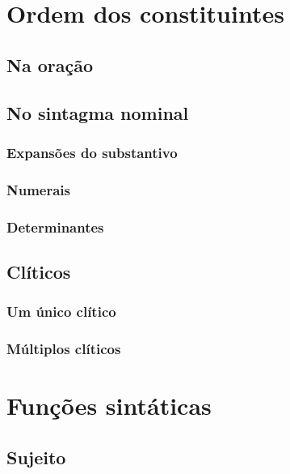 
\section{Ordem dos constituintes}
\lipsum[1]

\subsection{Na oração}
\lipsum[2]

\subsection{No sintagma nominal}
\lipsum[3]

\subsubsection{Expansões do substantivo}
\lipsum[4]

\subsubsection{Numerais}
\lipsum[5]

\subsubsection{Determinantes}\label{sec:determinação}
\lipsum[6]

\subsection{Clíticos}
\lipsum[7]

\subsubsection{Um único clítico}
\lipsum[8]

\subsubsection{Múltiplos clíticos}
\lipsum[9]

\section{Funções sintáticas}
\lipsum[10]
\subsection{Sujeito}
\lipsum[11]

